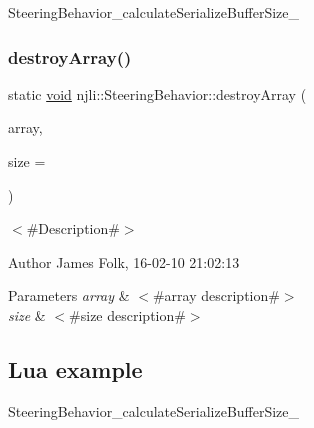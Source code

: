 \begin{DoxyCodeInclude}
\end{DoxyCodeInclude}
Steering\+Behavior\+\_\+calculate\+Serialize\+Buffer\+Size\+\_\+ \mbox{\label{classnjli_1_1_steering_behavior_aa24a3dcd73261a34b1bbb80804a97425}} 
\subsubsection{\texorpdfstring{destroy\+Array()}{destroyArray()}}
{\footnotesize\ttfamily static \mbox{\hyperlink{_thread_8h_af1e856da2e658414cb2456cb6f7ebc66}{void}} njli\+::\+Steering\+Behavior\+::destroy\+Array (\begin{DoxyParamCaption}\item[{\mbox{\hyperlink{classnjli_1_1_steering_behavior}{Steering\+Behavior}} $\ast$$\ast$}]{array,  }\item[{const \mbox{\hyperlink{_util_8h_a10e94b422ef0c20dcdec20d31a1f5049}{u32}}}]{size = {} }\end{DoxyParamCaption})\hspace{0.3cm}{\ttfamily [static]}}



$<$\#\+Description\#$>$ 

\begin{DoxyAuthor}{Author}
James Folk, 16-\/02-\/10 21\+:02\+:13
\end{DoxyAuthor}

\begin{DoxyParams}{Parameters}
{\em array} & $<$\#array description\#$>$ \\
\hline
{\em size} & $<$\#size description\#$>$\\
\hline
\end{DoxyParams}
\hypertarget{classnjli_1_1_steering_behavior_wander_ex1}{}\subsection{Lua example}\label{classnjli_1_1_steering_behavior_wander_ex1}

\begin{DoxyCodeInclude}
\end{DoxyCodeInclude}
Steering\+Behavior\+\_\+calculate\+Serialize\+Buffer\+Size\+\_\+ \mbox{\label{classnjli_1_1_steering_behavior_a7db08fdeb6eb0f065262f5ee0b1e26d1}} 
